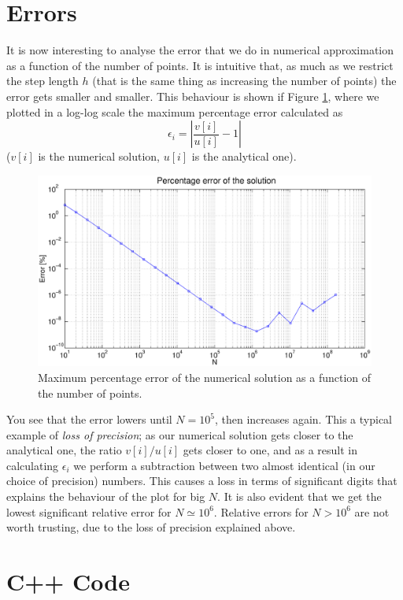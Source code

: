 \documentclass {article}
\begin{document}
\section{Errors}
It is now interesting to analyse the error that we do in numerical approximation as a function of the number of points. It is intuitive that, as much as we restrict the step length $h$ (that is the same thing as increasing the number of points) the error gets smaller and smaller. This behaviour is shown if Figure \ref{fig:errors}, where we plotted in a log-log scale the maximum percentage error calculated as
\begin{equation*}
	\epsilon_i = \left| \frac{v[i]}{u[i]} - 1 \right|
\end{equation*}
($v[i]$ is the numerical solution, $u[i]$ is the analytical one).
\begin{figure}[H]
	\centering
	\includegraphics[width=\textwidth]{errors}
	\caption{Maximum percentage error of the numerical solution as a function of the number of points.}
	\label{fig:errors}
\end{figure} 
You see that the error lowers until $N = 10^{5}$, then increases again. This a typical example of \emph{loss of precision}; as our numerical solution gets closer to the analytical one, the ratio $v[i]/u[i]$ gets closer to one, and as a result in calculating $\epsilon_i$ we perform a subtraction between two almost identical (in our choice of precision) numbers. This causes a loss in terms of significant digits that explains the behaviour of the plot for big $N$. It is also evident that we get the lowest significant relative error for $N \simeq 10^{6}$. Relative errors for $N > 10^{6}$ are not worth trusting, due to the loss of precision explained above.



\newpage
\section{C++ Code}
\end{document}
